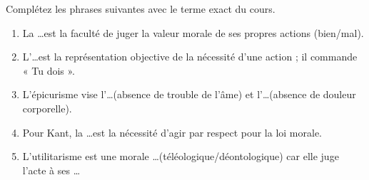 \documentclass[11pt]{article}
\begin{document}
\begin{exercice}
Complétez les phrases suivantes avec le terme exact du cours.
\begin{enumerate}
    \item La \ldots est la faculté de juger la valeur morale de ses propres actions (bien/mal).
    \item L'\ldots est la représentation objective de la nécessité d'une action ; il commande « Tu dois ».
    \item L'épicurisme vise l'\ldots (absence de trouble de l'âme) et l'\ldots (absence de douleur corporelle).
    \item Pour Kant, la \ldots est la nécessité d'agir par respect pour la loi morale.
    \item L'utilitarisme est une morale \ldots (téléologique/déontologique) car elle juge l'acte à ses \ldots
\end{enumerate}
\end{exercice}
\end{document}
